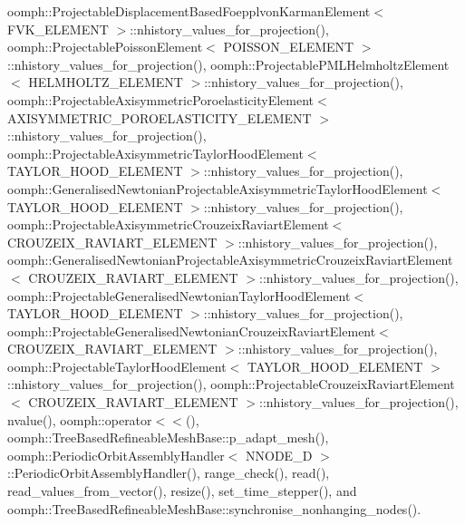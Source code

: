 oomph\+::\+Projectable\+Displacement\+Based\+Foepplvon\+Karman\+Element$<$ F\+V\+K\+\_\+\+E\+L\+E\+M\+E\+N\+T $>$\+::nhistory\+\_\+values\+\_\+for\+\_\+projection(), oomph\+::\+Projectable\+Poisson\+Element$<$ P\+O\+I\+S\+S\+O\+N\+\_\+\+E\+L\+E\+M\+E\+N\+T $>$\+::nhistory\+\_\+values\+\_\+for\+\_\+projection(), oomph\+::\+Projectable\+P\+M\+L\+Helmholtz\+Element$<$ H\+E\+L\+M\+H\+O\+L\+T\+Z\+\_\+\+E\+L\+E\+M\+E\+N\+T $>$\+::nhistory\+\_\+values\+\_\+for\+\_\+projection(), oomph\+::\+Projectable\+Axisymmetric\+Poroelasticity\+Element$<$ A\+X\+I\+S\+Y\+M\+M\+E\+T\+R\+I\+C\+\_\+\+P\+O\+R\+O\+E\+L\+A\+S\+T\+I\+C\+I\+T\+Y\+\_\+\+E\+L\+E\+M\+E\+N\+T $>$\+::nhistory\+\_\+values\+\_\+for\+\_\+projection(), oomph\+::\+Projectable\+Axisymmetric\+Taylor\+Hood\+Element$<$ T\+A\+Y\+L\+O\+R\+\_\+\+H\+O\+O\+D\+\_\+\+E\+L\+E\+M\+E\+N\+T $>$\+::nhistory\+\_\+values\+\_\+for\+\_\+projection(), oomph\+::\+Generalised\+Newtonian\+Projectable\+Axisymmetric\+Taylor\+Hood\+Element$<$ T\+A\+Y\+L\+O\+R\+\_\+\+H\+O\+O\+D\+\_\+\+E\+L\+E\+M\+E\+N\+T $>$\+::nhistory\+\_\+values\+\_\+for\+\_\+projection(), oomph\+::\+Projectable\+Axisymmetric\+Crouzeix\+Raviart\+Element$<$ C\+R\+O\+U\+Z\+E\+I\+X\+\_\+\+R\+A\+V\+I\+A\+R\+T\+\_\+\+E\+L\+E\+M\+E\+N\+T $>$\+::nhistory\+\_\+values\+\_\+for\+\_\+projection(), oomph\+::\+Generalised\+Newtonian\+Projectable\+Axisymmetric\+Crouzeix\+Raviart\+Element$<$ C\+R\+O\+U\+Z\+E\+I\+X\+\_\+\+R\+A\+V\+I\+A\+R\+T\+\_\+\+E\+L\+E\+M\+E\+N\+T $>$\+::nhistory\+\_\+values\+\_\+for\+\_\+projection(), oomph\+::\+Projectable\+Generalised\+Newtonian\+Taylor\+Hood\+Element$<$ T\+A\+Y\+L\+O\+R\+\_\+\+H\+O\+O\+D\+\_\+\+E\+L\+E\+M\+E\+N\+T $>$\+::nhistory\+\_\+values\+\_\+for\+\_\+projection(), oomph\+::\+Projectable\+Generalised\+Newtonian\+Crouzeix\+Raviart\+Element$<$ C\+R\+O\+U\+Z\+E\+I\+X\+\_\+\+R\+A\+V\+I\+A\+R\+T\+\_\+\+E\+L\+E\+M\+E\+N\+T $>$\+::nhistory\+\_\+values\+\_\+for\+\_\+projection(), oomph\+::\+Projectable\+Taylor\+Hood\+Element$<$ T\+A\+Y\+L\+O\+R\+\_\+\+H\+O\+O\+D\+\_\+\+E\+L\+E\+M\+E\+N\+T $>$\+::nhistory\+\_\+values\+\_\+for\+\_\+projection(), oomph\+::\+Projectable\+Crouzeix\+Raviart\+Element$<$ C\+R\+O\+U\+Z\+E\+I\+X\+\_\+\+R\+A\+V\+I\+A\+R\+T\+\_\+\+E\+L\+E\+M\+E\+N\+T $>$\+::nhistory\+\_\+values\+\_\+for\+\_\+projection(), nvalue(), oomph\+::operator$<$$<$(), oomph\+::\+Tree\+Based\+Refineable\+Mesh\+Base\+::p\+\_\+adapt\+\_\+mesh(), oomph\+::\+Periodic\+Orbit\+Assembly\+Handler$<$ N\+N\+O\+D\+E\+\_\+D $>$\+::\+Periodic\+Orbit\+Assembly\+Handler(), range\+\_\+check(), read(), read\+\_\+values\+\_\+from\+\_\+vector(), resize(), set\+\_\+time\+\_\+stepper(), and oomph\+::\+Tree\+Based\+Refineable\+Mesh\+Base\+::synchronise\+\_\+nonhanging\+\_\+nodes().


